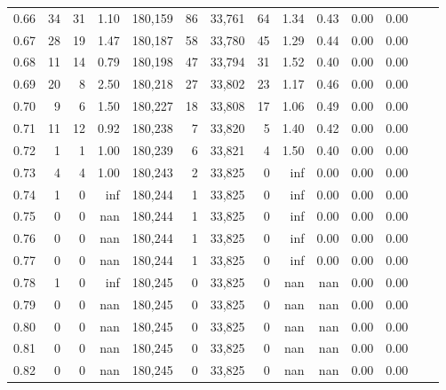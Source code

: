\begin{tabular}{rrrrrrrrrrrrrr}
0.66 &     34 &     31 &    1.10 &  180,159 &       86 &  33,761 &      64 &  1.34 &  0.43 &  0.00 &      0.00 \\
0.67 &     28 &     19 &    1.47 &  180,187 &       58 &  33,780 &      45 &  1.29 &  0.44 &  0.00 &      0.00 \\
0.68 &     11 &     14 &    0.79 &  180,198 &       47 &  33,794 &      31 &  1.52 &  0.40 &  0.00 &      0.00 \\
0.69 &     20 &      8 &    2.50 &  180,218 &       27 &  33,802 &      23 &  1.17 &  0.46 &  0.00 &      0.00 \\
0.70 &      9 &      6 &    1.50 &  180,227 &       18 &  33,808 &      17 &  1.06 &  0.49 &  0.00 &      0.00 \\
0.71 &     11 &     12 &    0.92 &  180,238 &        7 &  33,820 &       5 &  1.40 &  0.42 &  0.00 &      0.00 \\
0.72 &      1 &      1 &    1.00 &  180,239 &        6 &  33,821 &       4 &  1.50 &  0.40 &  0.00 &      0.00 \\
0.73 &      4 &      4 &    1.00 &  180,243 &        2 &  33,825 &       0 &   inf &  0.00 &  0.00 &      0.00 \\
0.74 &      1 &      0 &     inf &  180,244 &        1 &  33,825 &       0 &   inf &  0.00 &  0.00 &      0.00 \\
0.75 &      0 &      0 &     nan &  180,244 &        1 &  33,825 &       0 &   inf &  0.00 &  0.00 &      0.00 \\
0.76 &      0 &      0 &     nan &  180,244 &        1 &  33,825 &       0 &   inf &  0.00 &  0.00 &      0.00 \\
0.77 &      0 &      0 &     nan &  180,244 &        1 &  33,825 &       0 &   inf &  0.00 &  0.00 &      0.00 \\
0.78 &      1 &      0 &     inf &  180,245 &        0 &  33,825 &       0 &   nan &   nan &  0.00 &      0.00 \\
0.79 &      0 &      0 &     nan &  180,245 &        0 &  33,825 &       0 &   nan &   nan &  0.00 &      0.00 \\
0.80 &      0 &      0 &     nan &  180,245 &        0 &  33,825 &       0 &   nan &   nan &  0.00 &      0.00 \\
0.81 &      0 &      0 &     nan &  180,245 &        0 &  33,825 &       0 &   nan &   nan &  0.00 &      0.00 \\
0.82 &      0 &      0 &     nan &  180,245 &        0 &  33,825 &       0 &   nan &   nan &  0.00 &      0.00 \\

\end{tabular}
